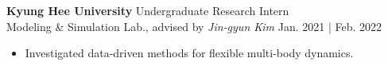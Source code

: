 \documentclass[a4paper,10pt]{extarticle}
\begin{document}
\vspace*{0.1cm}
\noindent\textbf{Kyung Hee University} \hfill Undergraduate Research Intern\\
Modeling \& Simulation Lab., advised by \textsl{Jin-gyun Kim} \hfill Jan. 2021 | Feb. 2022\\
\vspace*{-0.25cm}
\begin{minipage}{0.75\textwidth}
	\small
	\begin{itemize}
		\item Investigated data-driven methods for flexible multi-body dynamics.
	\end{itemize}
\end{minipage}\\
\vspace*{-0.2cm}





\end{document}
